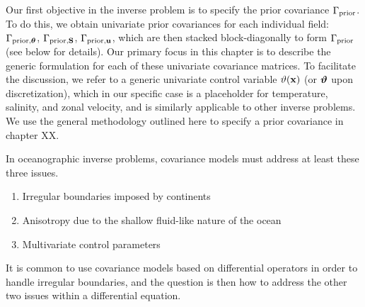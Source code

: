 Our first objective in the inverse problem is to specify the prior
covariance $\Gamma_{\text{prior}}$.
To do this, we obtain univariate prior covariances for
each individual field: $\Gamma_{\text{prior,}{\bm{\theta}}}$, $\Gamma_{\text{prior,}\mathbf{S}}$,
$\Gamma_{\text{prior,}\mathbf{u}}$, which are then stacked block-diagonally to form
$\Gamma_{\text{prior}}$ (see below for details).
Our primary focus in this chapter is to describe the generic formulation for
each of these univariate covariance matrices.
To facilitate the discussion, we refer to a generic univariate control variable
$\vartheta(\mathbf{x})$ (or $\bm{\vartheta}$ upon discretization), which in our specific case is a
placeholder for temperature, salinity, and zonal velocity, and is similarly
applicable to other inverse problems.
We use the general methodology outlined here to specify a prior covariance in
chapter XX.

In oceanographic inverse problems, covariance models must address at least
these three issues.
\begin{enumerate}
    \item Irregular boundaries imposed by continents
    \item Anisotropy due to the shallow fluid-like nature of the ocean
    \item Multivariate control parameters
\end{enumerate}
It is common to use covariance models based on differential operators in order
to handle irregular boundaries, and the question is then how to address the
other two issues within a differential equation.

